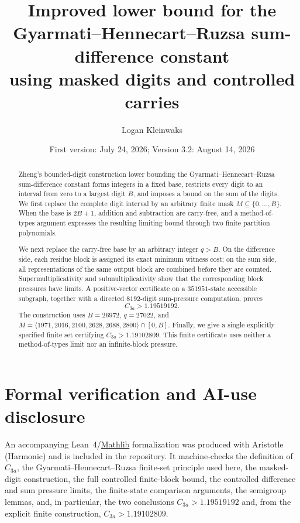 \documentclass[11pt]{article}
\title{Improved lower bound for the\\Gyarmati--Hennecart--Ruzsa
sum-difference constant\\using masked digits and controlled carries}
\author{Logan Kleinwaks}
\date{First version: July 24, 2026; Version 3.2: August 14, 2026}
\begin{document}
\maketitle

\begin{abstract}
Zheng's bounded-digit construction lower bounding the Gyarmati--Hennecart--Ruzsa
sum-difference constant forms integers in a fixed base, restricts every digit
to an interval from zero to a largest digit $B$, and imposes a bound on the
sum of the digits.  We first replace the complete digit interval by an
arbitrary finite mask $M\subseteq\{0,\ldots,B\}$.  When the
base is $2B+1$, addition and subtraction are carry-free, and a
method-of-types argument expresses the resulting limiting bound through two
finite partition polynomials.

We next replace the carry-free base by an arbitrary integer $q>B$.  On the difference
side, each residue block is assigned its exact minimum witness cost; on the
sum side, all representations of the same output block are combined before
they are counted.  Supermultiplicativity and submultiplicativity show that
the corresponding block pressures have limits.  A positive-vector
certificate on a $351951$-state accessible subgraph, together with a
directed $8192$-digit sum-pressure computation, proves
\[
 \boxed{C_{3a}>1.19519192}.
\]
The construction uses $B=26972$, $q=27022$, and
$M=\langle1971,2016,2100,2628,2688,2800\rangle\cap[0,B]$.
Finally, we give a single explicitly specified finite set certifying
$C_{3a}>1.19102809$.  This finite certificate uses neither a
method-of-types limit nor an infinite-block pressure.
\end{abstract}

\section*{Formal verification and AI-use disclosure}
An accompanying Lean~4/\href{https://github.com/leanprover-community/mathlib4}{Mathlib}
formalization was produced with Aristotle (Harmonic) \cite{Aristotle2025} and is included
in the repository.  It machine-checks the definition of $C_{3a}$, the
Gyarmati--Hennecart--Ruzsa finite-set principle used here, the masked-digit
construction, the full controlled finite-block bound, the controlled
difference and sum pressure limits, the finite-state comparison arguments,
the semigroup lemmas, and, in particular, the two conclusions $C_{3a}>1.19519192$ and, from the explicit finite construction, $C_{3a}>1.19102809$.
\end{document}
